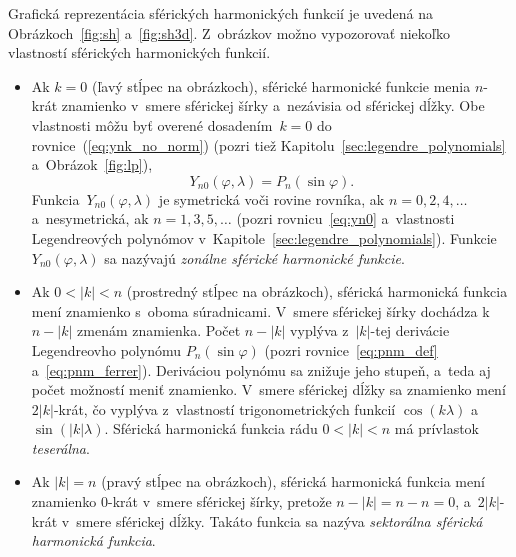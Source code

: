 \documentclass[a4paper,12pt]{book}
\begin{document}
Grafická reprezentácia sférických harmonických funkcií je uvedená na 
Obrázkoch~\ref{fig:sh} a~\ref{fig:sh3d}.  Z~obrázkov možno vypozorovať niekoľko 
vlastností sférických harmonických funkcií.
%
\begin{itemize}
\item Ak $k = 0$ (ľavý stĺpec na obrázkoch), sférické harmonické funkcie menia 
$n$-krát znamienko v~smere sférickej šírky a~nezávisia od sférickej dĺžky.  Obe 
vlastnosti môžu byť overené dosadením~$k = 0$ do rovnice~(\ref{eq:ynk_no_norm}) 
(pozri tiež Kapitolu~\ref{sec:legendre_polynomials} a~Obrázok~\ref{fig:lp}),
%
\begin{equation}
\label{eq:yn0}
Y_{n0}(\varphi, \lambda) = P_n(\sin\varphi){.}
\end{equation}
%
Funkcia~$Y_{n0}(\varphi, \lambda)$ je symetrická voči rovine rovníka, ak $n 
= 0, 2, 4, \dots$ a~nesymetrická, ak $n = 1, 3, 5, \dots$ (pozri 
rovnicu~\ref{eq:yn0} a~vlastnosti Legendreových polynómov 
v~Kapitole~\ref{sec:legendre_polynomials}). Funkcie~$Y_{n0}(\varphi, \lambda)$ 
sa nazývajú \emph{zonálne sférické harmonické funkcie}.

\item Ak $0 < |k| < n$ (prostredný stĺpec na obrázkoch), sférická harmonická 
funkcia mení znamienko s~oboma súradnicami.  V~smere sférickej šírky dochádza 
k~$n - |k|$ zmenám znamienka.  Počet $n - |k|$ vyplýva z~$|k|$-tej derivácie 
Legendreovho polynómu $P_n(\sin\varphi)$ (pozri rovnice~\ref{eq:pnm_def} 
a~\ref{eq:pnm_ferrer}).  Deriváciou polynómu sa znižuje jeho stupeň, a~teda aj 
počet možností meniť znamienko.  V~smere sférickej dĺžky sa znamienko mení 
$2|k|$-krát, čo vyplýva z~vlastností trigonometrických funkcií $\cos(k\lambda)$ 
a~$\sin(|k|\lambda)$.  Sférická harmonická funkcia rádu $0 < |k| < n$ má 
prívlastok \emph{teserálna}.

\item Ak $|k| = n$ (pravý stĺpec na obrázkoch), sférická harmonická funkcia 
mení znamienko $0$-krát v~smere sférickej šírky, pretože $n - |k| = n - n = 0$, 
a~$2|k|$-krát v~smere sférickej dĺžky.  Takáto funkcia sa nazýva 
\emph{sektorálna sférická harmonická funkcia}.
\end{itemize}
\end{document}
